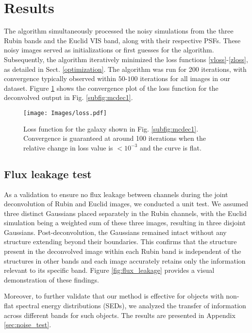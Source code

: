 \documentclass[traditabstract]{aa}
\begin{document}
\section{Results}
\label{results}

The algorithm simultaneously processed the noisy simulations from the three Rubin bands and the Euclid VIS band, along with their respective PSFs. These noisy images served as initializations or first guesses for the algorithm. Subsequently, the algorithm iteratively minimized the loss functions \ref{vloss}-\ref{zloss}, as detailed in Sect. \ref{optimization}. The algorithm was run for 200 iterations, with convergence typically observed within $50$-$100$ iterations for all images in our dataset. Figure \ref{fig:loss} shows the convergence plot of the loss function for the deconvolved output in Fig. \ref{subfig:mcdec1}.

\begin{figure}[h!]
    \centering
    \label{fig:loss}\texttt{[image: Images/loss.pdf]}
    \caption{Loss function for the galaxy shown in Fig. \ref{subfig:mcdec1}. Convergence is guaranteed at around 100 iterations when the relative change in loss value is $<10^{-3}$ and the curve is flat.}
    \label{fig:loss}
\end{figure}

\subsection{Flux leakage test}
\label{flux_leakage}

As a validation to ensure no flux leakage between channels during the joint deconvolution of Rubin and Euclid images, we conducted a unit test. We assumed three distinct Gaussians placed separately in the Rubin channels, with the Euclid simulation being a weighted sum of these three images, resulting in three disjoint Gaussians. Post-deconvolution, the Gaussians remained intact without any structure extending beyond their boundaries. This confirms that the structure present in the deconvolved image within each Rubin band is independent of the structures in other bands and each image accurately retains only the information relevant to its specific band. Figure \ref{fig:flux_leakage} provides a visual demonstration of these findings. 

Moreover, to further validate that our method is effective for objects with non-flat spectral energy distributions (SEDs), we analyzed the transfer of information across different bands for such objects. The results are presented in Appendix \ref{sec:noise_test}.
\end{document}
